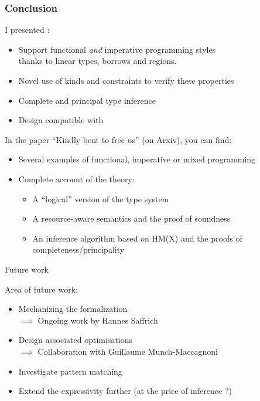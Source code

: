 \documentclass[xcolor=svgnames,11pt]{beamer}
\begin{document}



\begin{frame}
  \frametitle{Conclusion}

  I presented \lang:
  
  \begin{itemize}
  \item Support functional \emph{and} imperative programming styles\\
    thanks to linear types, borrows and regions.
  \item Novel use of kinds and constraints to verify these properties
  \item Complete and principal type inference
  \item Design compatible with \ocaml
  \end{itemize}\pause

  In the paper ``Kindly bent to free us'' (on Arxiv), you can find:
  \begin{itemize}
  \item Several examples of functional, imperative or mixed programming
  \item Complete account of the theory:
    \begin{itemize}
    \item A ``logical'' version of the type system
    \item A resource-aware semantics and the proof of soundness
    \item An inference algorithm based on HM(X) and the proofs of completeness/principality
    \end{itemize}
  \end{itemize}
\end{frame}


\begin{frame}{Future work}

  Area of future work:
  \begin{itemize}
  \item Mechanizing the formalization\\
    $\implies$ Ongoing work by Hannes Saffrich
  \item Design associated optimisations\\
    $\implies$ Collaboration with Guillaume Munch-Maccagnoni
  \item Investigate pattern matching
  \item Extend the expressivity further (at the price of inference ?)
  \end{itemize}
\end{frame}
\end{document}

